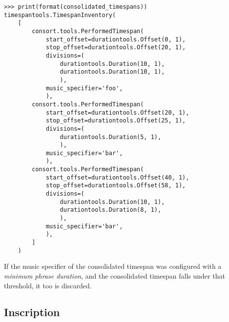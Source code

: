 \begin{abjadbookoutput}
\begin{singlespacing}
\vspace{-0.5\baselineskip}
\begin{verbatim}
>>> print(format(consolidated_timespans))
timespantools.TimespanInventory(
    [
        consort.tools.PerformedTimespan(
            start_offset=durationtools.Offset(0, 1),
            stop_offset=durationtools.Offset(20, 1),
            divisions=(
                durationtools.Duration(10, 1),
                durationtools.Duration(10, 1),
                ),
            music_specifier='foo',
            ),
        consort.tools.PerformedTimespan(
            start_offset=durationtools.Offset(20, 1),
            stop_offset=durationtools.Offset(25, 1),
            divisions=(
                durationtools.Duration(5, 1),
                ),
            music_specifier='bar',
            ),
        consort.tools.PerformedTimespan(
            start_offset=durationtools.Offset(40, 1),
            stop_offset=durationtools.Offset(58, 1),
            divisions=(
                durationtools.Duration(10, 1),
                durationtools.Duration(8, 1),
                ),
            music_specifier='bar',
            ),
        ]
    )
\end{verbatim}
\end{singlespacing}
\end{abjadbookoutput}

\noindent If the music specifier of the consolidated timespan was configured
with a \emph{minimum phrase duration}, and the consolidated timespan falls
under that threshold, it too is discarded.

\subsection{Inscription}
\label{ssec:inscription}

